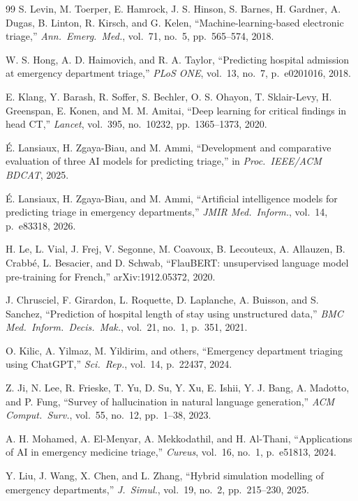 \documentclass[conference]{IEEEtran}
\begin{document}
\begin{thebibliography}{99}
S. Levin, M. Toerper, E. Hamrock, J. S. Hinson, S. Barnes, H. Gardner, A. Dugas, B. Linton, R. Kirsch, and G. Kelen, ``Machine-learning-based electronic triage,'' \emph{Ann.\ Emerg.\ Med.}, vol.~71, no.~5, pp.~565--574, 2018.

W. S. Hong, A. D. Haimovich, and R. A. Taylor, ``Predicting hospital admission at emergency department triage,'' \emph{PLoS ONE}, vol.~13, no.~7, p.~e0201016, 2018.

E. Klang, Y. Barash, R. Soffer, S. Bechler, O. S. Ohayon, T. Sklair-Levy, H. Greenspan, E. Konen, and M. M. Amitai, ``Deep learning for critical findings in head CT,'' \emph{Lancet}, vol.~395, no.~10232, pp.~1365--1373, 2020.

\'E. Lansiaux, H. Zgaya-Biau, and M. Ammi, ``Development and comparative evaluation of three AI models for predicting triage,'' in \emph{Proc.\ IEEE/ACM BDCAT}, 2025.

\'E. Lansiaux, H. Zgaya-Biau, and M. Ammi, ``Artificial intelligence models for predicting triage in emergency departments,'' \emph{JMIR Med.\ Inform.}, vol.~14, p.~e83318, 2026.

H. Le, L. Vial, J. Frej, V. Segonne, M. Coavoux, B. Lecouteux, A. Allauzen, B. Crabb\'e, L. Besacier, and D. Schwab, ``FlauBERT: unsupervised language model pre-training for French,'' arXiv:1912.05372, 2020.

J. Chrusciel, F. Girardon, L. Roquette, D. Laplanche, A. Buisson, and S. Sanchez, ``Prediction of hospital length of stay using unstructured data,'' \emph{BMC Med.\ Inform.\ Decis.\ Mak.}, vol.~21, no.~1, p.~351, 2021.

O. Kilic, A. Yilmaz, M. Yildirim, and others, ``Emergency department triaging using ChatGPT,'' \emph{Sci.\ Rep.}, vol.~14, p.~22437, 2024.

Z. Ji, N. Lee, R. Frieske, T. Yu, D. Su, Y. Xu, E. Ishii, Y. J. Bang, A. Madotto, and P. Fung, ``Survey of hallucination in natural language generation,'' \emph{ACM Comput.\ Surv.}, vol.~55, no.~12, pp.~1--38, 2023.

A. H. Mohamed, A. El-Menyar, A. Mekkodathil, and H. Al-Thani, ``Applications of AI in emergency medicine triage,'' \emph{Cureus}, vol.~16, no.~1, p.~e51813, 2024.

Y. Liu, J. Wang, X. Chen, and L. Zhang, ``Hybrid simulation modelling of emergency departments,'' \emph{J.\ Simul.}, vol.~19, no.~2, pp.~215--230, 2025.


\end{thebibliography}
\end{document}
